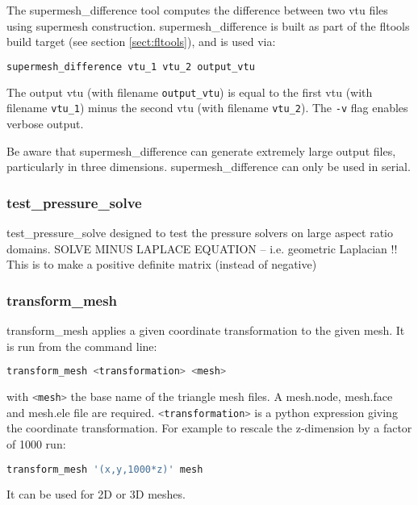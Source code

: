 The supermesh\_difference tool computes the difference between two vtu
files using supermesh construction. supermesh\_difference is built as part of
the fltools build target (see section \ref{sect:fltools}), and is used via:

\begin{lstlisting}[language = Bash]
supermesh_difference vtu_1 vtu_2 output_vtu
\end{lstlisting}

The output vtu (with filename \lstinline[language = Bash]+output_vtu+)
is equal to the first vtu (with filename \lstinline[language = Bash]+vtu_1+)
minus the second vtu (with filename \lstinline[language = Bash]+vtu_2+).  The
\lstinline[language = Bash]+-v+ flag enables verbose output.

Be aware that supermesh\_difference can generate extremely large output files,
particularly in three dimensions. supermesh\_difference can only be used in
serial.


\subsubsection{test\_pressure\_solve}
\label{sect:test_pressure_solve}
test\_pressure\_solve designed to test the pressure solvers on large aspect ratio domains. SOLVE MINUS LAPLACE EQUATION -- i.e. geometric Laplacian
  !! This is to make a positive definite matrix (instead of negative)


\subsubsection{transform\_mesh}
\label{sect:transform_mesh}

transform\_mesh applies a given coordinate transformation to the given mesh. It is run from the command line:
\begin{lstlisting}[language = Bash]
transform_mesh <transformation> <mesh>
\end{lstlisting}
with \lstinline[language = Bash]+<mesh>+ the base name of the triangle mesh files. A mesh.node, mesh.face and mesh.ele file are required. \lstinline[language = Bash]+<transformation>+ is a python expression giving the coordinate transformation. For example to rescale the z-dimension by a factor of 1000 run:
\begin{lstlisting}[language = Bash]
transform_mesh '(x,y,1000*z)' mesh
\end{lstlisting}
It can be used for 2D or 3D meshes.


